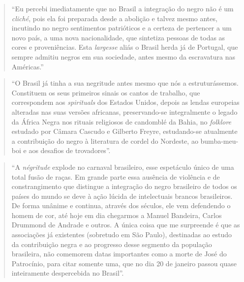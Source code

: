 \documentclass[
  letterpaper,
  DIV=11,
  numbers=noendperiod]{scrreprt}
\begin{document}
\begin{quote}
``Eu percebi imediatamente que no Brasil a integração do negro não é um
\emph{cliché}, pois ela foi preparada desde a abolição e talvez mesmo
antes, incutindo no negro sentimentos patrióticos e a certeza de
pertencer a um novo país, a uma nova nacionalidade, que sintetiza
pessoas de todas as cores e proveniências. Esta \emph{largesse} aliás o
Brasil herda já de Portugal, que sempre admitiu negros em sua sociedade,
antes mesmo da escravatura nas Américas.''
\end{quote}

\begin{quote}
``O Brasil já tinha a sua negritude antes mesmo que nós a
estruturássemos. Constituem os seus primeiros sinais os cantos de
trabalho, que correspondem aos \emph{spirituals} dos Estados Unidos,
depois as lendas europeias alteradas nas suas versões africanas,
preservando-se integralmente o legado da África Negra nos rituais
religiosos de candomblé da Bahia, no \emph{folklore} estudado por Câmara
Cascudo e Gilberto Freyre, estudando-se atualmente a contribuição do
negro à literatura de cordel do Nordeste, ao bumba-meu-boi e aos
desafios de trovadores''.
\end{quote}

\begin{quote}
``A \emph{négritude} explode no carnaval brasileiro, esse espetáculo
único de uma total fusão de raças. Em grande parte essa ausência de
violência e de constrangimento que distingue a integração do negro
brasileiro de todos os países do mundo se deve à ação lúcida de
intelectuais brancos brasileiros. De forma unânime e continua, através
dos séculos, ele vem defendendo o homem de cor, até hoje em dia
chegarmos a Manuel Bandeira, Carlos Drummond de Andrade e outros. A
única coisa que me surpreende é que as associações já existentes
(sobretudo em São Paulo), destinadas ao estudo da contribuição negra e
ao progresso desse segmento da população brasileira, não comemorem datas
importantes como a morte de José do Patrocínio, para citar somente uma,
que no dia 20 de janeiro passou quase inteiramente despercebida no
Brasil''.
\end{quote}
\end{document}
